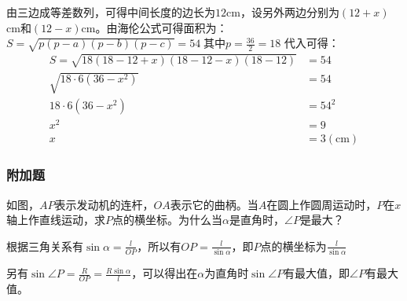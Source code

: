 \documentclass[answers]{exam}
\begin{document}
\begin{questions}
\begin{solution}

		由三边成等差数列，可得中间长度的边长为$12$cm，设另外两边分别为$(12+x)$cm和$(12-x)$cm。由海伦公式可得面积为：
		\begin{math}
			S = \sqrt{p(p-a)(p-b)(p-c)} = 54\; \text{其中} p = \frac{36}{2} = 18
		\end{math}
		代入可得：
		\begin{align*}
			S = \sqrt{18(18 - 12 + x)(18 - 12 - x)(18 - 12)} & = 54              \\
			\sqrt{18\cdot 6 (36-x^2)}                        & = 54              \\
			18\cdot 6 (36- x^2)                              & = 54^2            \\
			x^2                                              & = 9               \\
			x                                                & = 3 (\mathrm{cm})
		\end{align*}

	\end{solution}

	\begin{center}
		\subsubsection*{附加题}
	\end{center}

	\question
	如图，$AP$表示发动机的连杆，$OA$表示它的曲柄。当$A$在圆上作圆周运动时，$P$在$x$轴上作直线运动，求$P$点的横坐标。为什么当$\alpha$是直角时，$\angle{P}$是最大？

	\begin{solution}
		根据三角关系有$\sin\alpha = \frac{l}{OP}$，所以有$OP =
			\frac{l}{\sin\alpha}$，即$P$点的横坐标为$\frac{l}{\sin\alpha}$

			另有$\sin\angle{P} = \frac{R}{OP} =
			\frac{R\sin\alpha}{l}$，可以得出在$\alpha$为直角时$\sin\angle{P}$有最大值，即$\angle{P}$有最大值。
	\end{solution}


\end{questions}
\end{document}
